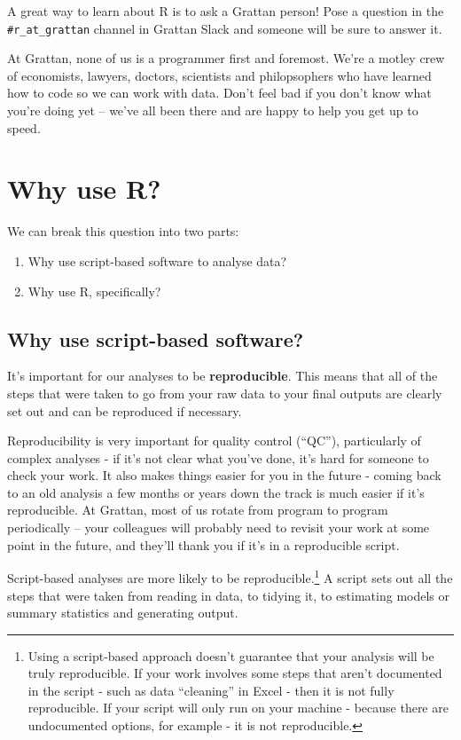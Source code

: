 \documentclass[
]{book}
\providecommand{\tightlist}{%
  \setlength{\itemsep}{0pt}\setlength{\parskip}{0pt}}
\begin{document}
A great way to learn about R is to ask a Grattan person! Pose a question in the \texttt{\#r\_at\_grattan} channel in Grattan Slack and someone will be sure to answer it.

At Grattan, none of us is a programmer first and foremost. We're a motley crew of economists, lawyers, doctors, scientists and philopsophers who have learned how to code so we can work with data. Don't feel bad if you don't know what you're doing yet -- we've all been there and are happy to help you get up to speed.

\hypertarget{why-use-r}{%
\chapter{Why use R?}\label{why-use-r}}

We can break this question into two parts:

\begin{enumerate}
\def\labelenumi{\arabic{enumi}.}
\tightlist
\item
  Why use script-based software to analyse data?
\item
  Why use R, specifically?
\end{enumerate}

\hypertarget{why-script}{%
\section{Why use script-based software?}\label{why-script}}

It's important for our analyses to be \textbf{reproducible}. This means that all of the steps that were taken to go from your raw data to your final outputs are clearly set out and can be reproduced if necessary.

Reproducibility is very important for quality control (``QC''), particularly of complex analyses - if it's not clear what you've done, it's hard for someone to check your work. It also makes things easier for you in the future - coming back to an old analysis a few months or years down the track is much easier if it's reproducible. At Grattan, most of us rotate from program to program periodically -- your colleagues will probably need to revisit your work at some point in the future, and they'll thank you if it's in a reproducible script.

Script-based analyses are more likely to be reproducible.\footnote{Using a script-based approach doesn't guarantee that your analysis will be truly reproducible. If your work involves some steps that aren't documented in the script - such as data ``cleaning'' in Excel - then it is not fully reproducible. If your script will only run on your machine - because there are undocumented options, for example - it is not reproducible.} A script sets out all the steps that were taken from reading in data, to tidying it, to estimating models or summary statistics and generating output.
\end{document}
